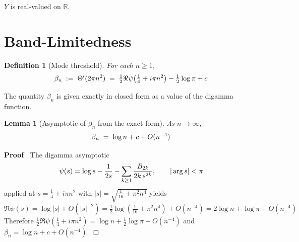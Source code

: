 \documentclass{article}
\newcommand{\assign}{:=}
\newenvironment{proof}{\noindent\textbf{Proof\ }}{\hspace*{\fill}$\Box$\medskip}
\newtheorem{definition}{Definition}
\newtheorem{lemma}{Lemma}
\begin{document}
$Y$ is real-valued on $\mathbb{R}$.

\section{Band-Limitedness}

\begin{definition}
  [Mode threshold]\label{def:betan} For each $n \ge 1$,
  \begin{equation}
    \beta_n \hspace{0.27em} \assign \hspace{0.27em} \Theta'  (2 \pi n^2)
    \hspace{0.27em} = \hspace{0.27em} \tfrac{1}{2} \Re \psi \hspace{-0.17em}
    \left( \tfrac{1}{4} + i \pi n^2 \right) - \tfrac{1}{2} \log \pi + c
  \end{equation}
\end{definition}

The quantity $\beta_n$ is given exactly in closed form as a value of the
digamma function.

\begin{lemma}
  [Asymptotic of $\beta_n$ from the exact form]\label{lem:betaasymp} As $n \to
  \infty$,
  \begin{equation}
    \beta_n \hspace{0.27em} = \hspace{0.27em} \log n + c + O (n^{- 4})
  \end{equation}
\end{lemma}

\begin{proof}
  The digamma asymptotic
  \begin{equation}
    \psi (s) = \log s - \frac{1}{2 s} - \sum_{k \ge 1} \frac{B_{2 k}}{2 k
    \hspace{0.17em} s^{2 k}}, \qquad | \arg s| < \pi
  \end{equation}
  applied at $s = \tfrac{1}{4} + i \pi n^2$ with $|s| = \sqrt{\tfrac{1}{16} +
  \pi^2 n^4}$ yields
  \begin{equation}
    \Re \psi (s) = \log |s| + O (|s|^{- 2}) = \tfrac{1}{2} \log (\tfrac{1}{16}
    + \pi^2 n^4) + O (n^{- 4}) = 2 \log n + \log \pi + O (n^{- 4})
  \end{equation}
  Therefore $\tfrac{1}{2} \Re \psi (\tfrac{1}{4} + i \pi n^2) = \log n +
  \tfrac{1}{2} \log \pi + O (n^{- 4})$ and $\beta_n = \log n + c + O (n^{-
  4})$.
\end{proof}
\end{document}
